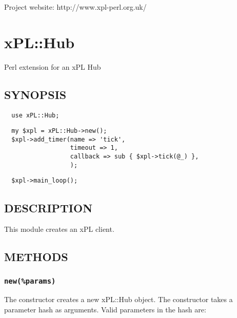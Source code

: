 Project website: http://www.xpl-perl.org.uk/

\section{xPL::Hub\label{xPL::Hub}}


Perl extension for an xPL Hub

\subsection*{SYNOPSIS\label{xPL::Hub_SYNOPSIS}}
\begin{verbatim}
  use xPL::Hub;
\end{verbatim}
\begin{verbatim}
  my $xpl = xPL::Hub->new();
  $xpl->add_timer(name => 'tick',
                  timeout => 1,
                  callback => sub { $xpl->tick(@_) },
                  );
\end{verbatim}
\begin{verbatim}
  $xpl->main_loop();
\end{verbatim}
\subsection*{DESCRIPTION\label{xPL::Hub_DESCRIPTION}}


This module creates an xPL client.

\subsection*{METHODS\label{xPL::Hub_METHODS}}
\subsubsection*{\texttt{new(\%params)}\label{xPL::Hub_new_params_}}


The constructor creates a new xPL::Hub object.  The constructor
takes a parameter hash as arguments.  Valid parameters in the hash
are:


